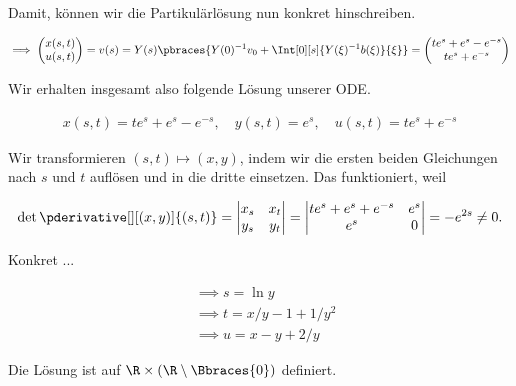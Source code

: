 \begin{solution}
Damit, können wir die Partikulärlösung nun konkret hinschreiben.

\begin{align*}
    \implies
    \begin{pmatrix}
        x(s, t)  \\ u(s, t)
    \end{pmatrix}
    =
    v(s)
    =
    Y(s)
    \pbraces
    {
        Y(0)^{-1} v_0
        +
        \Int[0][s]{Y(\xi)^{-1} b(\xi)}{\xi}
    }
    =
    \begin{pmatrix}
        t e^s + e^s - e^{-s} \\
        t e^s + e^{-s}
    \end{pmatrix}
\end{align*}

Wir erhalten insgesamt also folgende Lösung unserer ODE.

\begin{align*}
    x(s, t) = t e^s + e^s - e^{-s},
    \quad
    y(s, t) = e^s,
    \quad
    u(s, t) = t e^s + e^{-s}
\end{align*}

Wir transformieren $(s, t) \mapsto (x, y)$, indem wir die ersten beiden Gleichungen nach $s$ und $t$ auflösen und in die dritte einsetzen.
Das funktioniert, weil

\begin{align*}
    \det \pderivative[][(x, y)]{(s, t)}
    =
    \begin{vmatrix}
        x_s & x_t \\
        y_s & y_t
    \end{vmatrix}
    =
    \begin{vmatrix}
        t e^s + e^s + e^{-s} & e^s \\
        e^s                  & 0
    \end{vmatrix}
    =
    -e^{2s} \neq 0.
\end{align*}

Konkret ...

\begin{align*}
    & \implies
    s = \ln{y} \\
    & \implies
    t = x/y - 1 + 1/y^2 \\
    & \implies
    u = x - y + 2/y
\end{align*}

Die Lösung ist auf $\R \times (\R \setminus \Bbraces{0})$ definiert.

\end{solution}

